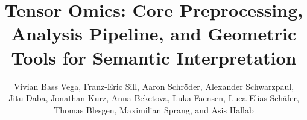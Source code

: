 \documentclass{article}
\title{Tensor Omics: Core Preprocessing, Analysis Pipeline, and Geometric Tools
  for Semantic Interpretation}
\author{Vivian Bass Vega, Franz-Eric Sill, Aaron Schröder, Alexander Schwarzpaul,\\
Jitu Daba, Jonathan Kurz, Anna Beketova, Luka Faensen, Luca Elias Schäfer,\\
Thomas Blesgen, Maximilian Sprang, and Asis Hallab}
\newcommand\Files[1]{}
\begin{document}
\maketitle

\tableofcontents
\newpage

\Files{Overview}
\Files{Omics_Data_Integration}
\Files{From_Raw_Data_to_Expression_Vectors}
\Files{Normalization_of_Expression_Values}
\Files{Construction_of_Expression_Vector_Space}
\Files{Gene_Family_Grouping_and_Centroid_Estimation}
\Files{Space_Interpolation_and_Smoothing}
\Files{Empirical_Distribution_Estimation}
\Files{Outlier_Detection_and_Shift_Vector_Calculation}
\Files{Empirical_Noise-Based_Significance_of_Distances}
\Files{Tissue_Versatility_Calculation}
\Files{Clock_Plot_Projection_and_Rotation_Angle_Computation}
\Files{Geometric_Tools_for_Semantic_Interpretation}
\Files{Time_Series_Analysis}
\Files{Gilgamesh_Learning__Semantic_Field-Aware_Pattern_Classification}
\Files{Shape_truthful_clustering}%
\Files{Detection_of_Subfunctionalization_and_Dosage_Effects_via_Dynamic_Programming}
\Files{Trajectory-Based_Signed_Contribution_Analysis}
\Files{Tensor_Omics_Module_Descriptors_TOXMD}
\Files{Field_Surface_and_Volume_Inference_FiSure_Eitri}
\Files{Shatter_Clustering}
\end{document}
